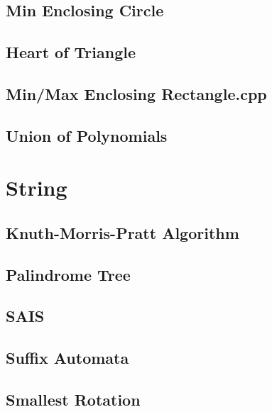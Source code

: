 \documentclass[a4paper,10pt,twocolumn,oneside]{article}
\begin{document}
\subsection{Min Enclosing Circle}

\subsection{Heart of Triangle}

\subsection{Min/Max Enclosing Rectangle.cpp}

\subsection{Union of Polynomials}


\section{String}
\subsection{Knuth-Morris-Pratt Algorithm}

\subsection{Palindrome Tree}

\subsection{SAIS}

\subsection{Suffix Automata}

\subsection{Smallest Rotation}

\end{document}
